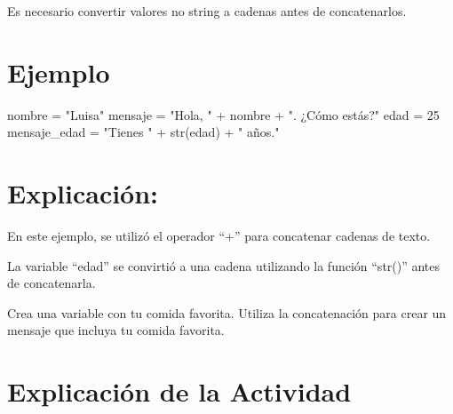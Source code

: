 \documentclass[
  a4paper,
  DIV=11,
  numbers=noendperiod,
  onepage,
  openany]{scrreprt}
\newenvironment{Shaded}{\begin{snugshade}}{\end{snugshade}}
\newcommand{\BuiltInTok}[1]{\textcolor[rgb]{0.00,0.23,0.31}{#1}}
\newcommand{\DecValTok}[1]{\textcolor[rgb]{0.68,0.00,0.00}{#1}}
\newcommand{\NormalTok}[1]{\textcolor[rgb]{0.00,0.23,0.31}{#1}}
\newcommand{\OperatorTok}[1]{\textcolor[rgb]{0.37,0.37,0.37}{#1}}
\newcommand{\StringTok}[1]{\textcolor[rgb]{0.13,0.47,0.30}{#1}}
\begin{document}
Es necesario convertir valores no string a cadenas antes de
concatenarlos.

\hypertarget{ejemplo-14}{%
\section{Ejemplo}\label{ejemplo-14}}

\begin{Shaded}
\begin{Highlighting}[]
\NormalTok{nombre }\OperatorTok{=} \StringTok{"Luisa"}
\NormalTok{mensaje }\OperatorTok{=} \StringTok{"Hola, "} \OperatorTok{+}\NormalTok{ nombre }\OperatorTok{+} \StringTok{". ¿Cómo estás?"}
\NormalTok{edad }\OperatorTok{=} \DecValTok{25}
\NormalTok{mensaje\_edad }\OperatorTok{=} \StringTok{"Tienes "} \OperatorTok{+} \BuiltInTok{str}\NormalTok{(edad) }\OperatorTok{+} \StringTok{" años."}
\end{Highlighting}
\end{Shaded}

\hypertarget{explicaciuxf3n-14}{%
\section{Explicación:}\label{explicaciuxf3n-14}}

En este ejemplo, se utilizó el operador ``+'' para concatenar cadenas de
texto.

La variable ``edad'' se convirtió a una cadena utilizando la función
``str()'' antes de concatenarla.

\begin{tcolorbox}[enhanced jigsaw, colbacktitle=quarto-callout-important-color!10!white, toprule=.15mm, leftrule=.75mm, titlerule=0mm, opacityback=0, rightrule=.15mm, opacitybacktitle=0.6, breakable, left=2mm, coltitle=black, title=\textcolor{quarto-callout-important-color}{\faExclamation}\hspace{0.5em}{Actividad Práctica:}, toptitle=1mm, bottomtitle=1mm, arc=.35mm, bottomrule=.15mm, colback=white, colframe=quarto-callout-important-color-frame]

Crea una variable con tu comida favorita. Utiliza la concatenación para
crear un mensaje que incluya tu comida favorita.

\end{tcolorbox}

\hypertarget{explicaciuxf3n-de-la-actividad-12}{%
\section{Explicación de la
Actividad}\label{explicaciuxf3n-de-la-actividad-12}}
\end{document}
